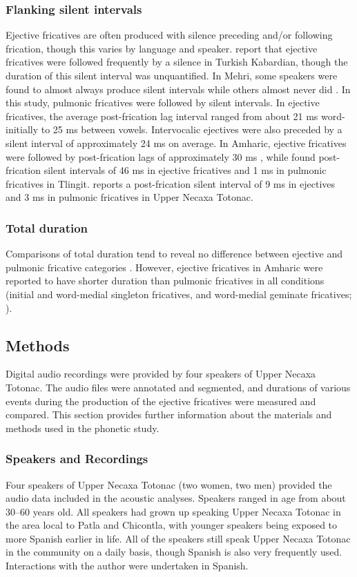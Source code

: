 \documentclass[output=paper,colorlinks,citecolor=brown]{langscibook}
\begin{document}
\subsubsection{Flanking silent intervals}
Ejective fricatives are often produced with silence preceding and/or following frication, though this varies by language and speaker. \citet{Gordon2006} report that ejective fricatives were followed frequently by a silence in Turkish Kabardian, though the duration of this silent interval was unquantified. In Mehri, some speakers were found to almost always produce silent intervals while others almost never did \citep{Ridouane2015}. In this study, pulmonic fricatives were followed by silent intervals. In ejective fricatives, the average post-frication lag interval ranged from about 21 ms word-initially to 25 ms between vowels. Intervocalic ejectives were also preceded by a silent interval of approximately 24 ms on average. In Amharic, ejective fricatives were followed by post-frication lags of approximately 30 ms \citep{Demolin2002,Seid2009}, while \citet{Maddieson2001a} found post-frication silent intervals of 46 ms in ejective fricatives and 1 ms in pulmonic fricatives in Tlingit. \citet{Beck2006} reports a post-frication silent interval of 9 ms in ejectives and 3 ms in pulmonic fricatives in Upper Necaxa Totonac.

\subsubsection{Total duration}
Comparisons of total duration tend to reveal no difference between ejective and pulmonic fricative categories \citep{Ridouane2015,Ridouane2017,Maddieson2001a}. However, ejective fricatives in Amharic were reported to have shorter duration than pulmonic fricatives in all conditions (initial and word-medial singleton fricatives, and word-medial geminate fricatives; \citealt{Seid2009}).

\subsection{Methods}\label{section:methods}
Digital audio recordings were provided by four speakers of Upper Necaxa Totonac. The audio files were annotated and segmented, and durations of various events during the production of the ejective fricatives were measured and compared. This section provides further information about the materials and methods used in the phonetic study.

\subsubsection{Speakers and Recordings}
Four speakers of Upper Necaxa Totonac (two women, two men) provided the audio data included in the acoustic analyses. Speakers ranged in age from about 30--60 years old. All speakers had grown up speaking Upper Necaxa Totonac in the area local to Patla and Chicontla, with younger speakers being exposed to more Spanish earlier in life. All of the speakers still speak Upper Necaxa Totonac in the community on a daily basis, though Spanish is also very frequently used. Interactions with the author were undertaken in Spanish.
\end{document}
